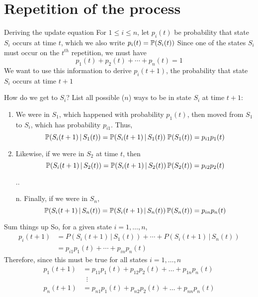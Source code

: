 \documentclass[aspectratio=169]{beamer}\usepackage[]{graphicx}\usepackage[]{xcolor}
\begin{document}
\section{Repetition of the process}

\begin{frame}{Deriving the update equation}
For $1\leq i\leq n$, let $p_i(t)$ be probability that state $S_i$ occurs at time $t$, which we also write $p_i(t)=\mathbb{P}(S_i(t))$
\vfill
Since one of the states $S_i$ must occur on the $t^{th}$ repetition, we must have
\[
p_1(t)+p_2(t)+\cdots+p_n(t)=1
\]
\vfill
We want to use this information to derive $p_i(t+1)$, the probability that state $S_i$ occurs at time $t+1$
\
\end{frame}

\begin{frame}{How do we get to $S_i$?}
List all possible ($n$) ways to be in state $S_i$ at time $t+1$:
\vfill
\begin{enumerate}
\item We were in $S_1$, which happened with probability $p_1(t)$, then moved from $S_1$ to $S_i$, which has probability $p_{i1}$. Thus, 
\[
\mathbb{P}(S_i(t+1)\,|\, S_1(t)) = 
\mathbb{P}(S_i(t+1)\,|\,S_1(t)) \; \mathbb{P}(S_1(t)) = 
p_{i1}p_1(t)
\]
\vfill
\item Likewise, if we were in $S_2$ at time $t$, then
\[
\mathbb{P}(S_i(t+1)\,|\, S_2(t)) = 
\mathbb{P}(S_i(t+1)\,|\,S_2(t))\,\mathbb{P}(S_2(t)) =
p_{i2}p_2(t)
\]
\vfill
\item[..]\mbox{}
\vfill
\item[n.] Finally, if we were in $S_n$,
\[
\mathbb{P}(S_i(t+1)\,|\, S_n(t)) = 
\mathbb{P}(S_i(t+1)\,|\,S_n(t))\,\mathbb{P}(S_n(t)) =
p_{in}p_n(t)
\]
\end{enumerate}
\end{frame}


\begin{frame}{Sum things up}
So, for a given state $i=1,\ldots,n$,
\begin{align*}
p_i(t+1) &= P(S_i(t+1)\,|\,S_1(t))+\cdots+P(S_i(t+1)\,|\,S_n(t)) \\
&= p_{i1}p_1(t)+\cdots+p_{in}p_n(t)
\end{align*}
\vfill
Therefore, since this must be true for all states $i=1,\ldots,n$
\begin{align*}
p_1(t+1) &= p_{11}p_1(t)+p_{12}p_2(t)+\dots+p_{1n}p_n(t) \\
& \;\;\vdots\\
p_n(t+1) &= p_{n1}p_1(t)+p_{n2}p_2(t)+\dots+p_{nn}p_n(t)
\end{align*}
\end{frame}
\end{document}
